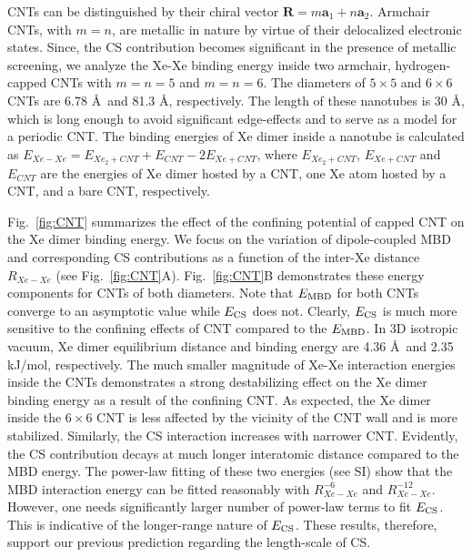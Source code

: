 \documentclass[aps,prl,groupaddress, twocolumn]{revtex4-1}  %
\begin{document}
CNTs can be distinguished by their chiral vector $\mathbf{R}=m \mathbf{a}_1 +n \mathbf{a}_2 $.
Armchair CNTs, with $m=n$, are metallic in nature by virtue of their delocalized electronic states. Since, the CS contribution becomes significant in the presence of metallic screening\cite{sadhukhan_prl_2017}, we analyze the Xe-Xe binding energy inside two armchair, hydrogen-capped CNTs with $m = n = 5$ and $m = n = 6$. The diameters of $5\times5$ and $6\times6$ CNTs are 6.78 \AA\ and 81.3 \AA, respectively. The length of these nanotubes is 30 \AA, which is long enough to avoid significant edge-effects and to serve as a model for a periodic CNT\@. The binding energies of Xe dimer inside a nanotube is calculated as $E_{Xe-Xe} = E_{Xe_2+CNT}+E_{CNT} - 2 E_{Xe+CNT}$, where $E_{Xe_2+CNT}$, $E_{Xe+CNT}$ and $E_{CNT}$ are the energies of Xe dimer hosted by a CNT, one Xe atom hosted by a CNT, and a bare CNT, respectively.

Fig.~\ref{fig:CNT} summarizes the effect of the confining potential of capped CNT on the Xe dimer binding energy. We focus on the variation of dipole-coupled MBD and corresponding CS contributions as a function of the inter-Xe distance $R_{Xe-Xe}$ (see Fig.~\ref{fig:CNT}A). Fig.~\ref{fig:CNT}B demonstrates these energy components for CNTs of both diameters. Note that $E_{\rm MBD}$ for both CNTs converge to an asymptotic value while $E_{\rm CS}$ does not. Clearly, $E_{\rm CS}$ is much more sensitive to the confining effects of CNT compared to the $E_{\rm MBD}$. In 3D isotropic vacuum, Xe dimer equilibrium distance and binding energy are 4.36 \AA\ and 2.35 kJ/mol, respectively\cite{Jerabek_2017}. The much smaller magnitude of Xe-Xe interaction energies inside the CNTs demonstrates a strong destabilizing effect on the Xe dimer binding energy as a result of the confining CNT\@. As expected, the Xe dimer inside the $6\times6$ CNT is less affected by the vicinity of the CNT wall and is more stabilized. Similarly, the CS interaction increases with narrower CNT\@. Evidently, the CS contribution decays at much longer interatomic distance compared to the MBD energy. The power-law fitting of these two energies (see SI) show that the MBD interaction energy can be fitted reasonably with $R_{Xe-Xe}^{-6}$ and $R_{Xe-Xe}^{-12}$. However, one needs significantly larger number of power-law terms to fit $E_{\rm CS}$. This is indicative of the longer-range nature of $E_{\rm CS}$. These results, therefore, support our previous prediction regarding the length-scale of CS\cite{sadhukhan_prl_2017, sadhukhan_prl_reply2018}.
\end{document}

